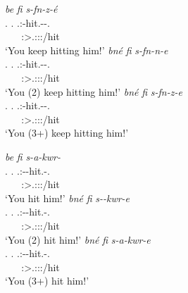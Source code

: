 \begin{exe}
\ex
\label{ex140}
\begin{xlist}
	\ex %
	\glll \emph{be} \emph{fi} \emph{s-fn-z-é}\\
	 \Ssg{}.\Erg{} \Third{}.\Abs{} \Tsg{}.\Masc{}:\Bet{}-hit.\Ext{}-\Ndu{}-\Ssg{}.\Imp{}\\
	 ~ ~ {\Ssg:\Sbj>\Tsg.\Masc:\Obj:\Imp:\Ipfv/hit}\\
	\trans `You keep hitting him!'
	\label{ex141}
	\ex %
	\glll \emph{bné} \emph{fi} \emph{s-fn-n-e}\\
	 \Snsg{}.\Erg{} \Third{}.\Abs{} \Tsg{}.\Masc{}:\Bet{}-hit.\Ext{}-\Du{}-\Snsg{}.\Imp{}\\
	  ~ ~ {\Sdu:\Sbj>\Tsg.\Masc:\Obj:\Imp:\Ipfv/hit}\\
	\trans `You (2) keep hitting him!'
	\label{ex142}
	\ex %
	\glll \emph{bné} \emph{fi} \emph{s-fn-z-e}\\
	 \Snsg{}.\Erg{} \Third{}.\Abs{} \Tsg{}.\Masc{}:\Bet{}-hit.\Ext{}-\Ndu{}-\Snsg{}.\Imp{}\\
	  ~ ~ {\Spl:\Sbj>\Tsg.\Masc:\Obj:\Imp:\Ipfv/hit}\\
	\trans `You (3+) keep hitting him!'
	\label{ex143}
\end{xlist}
\end{exe}%
\begin{exe}
\ex
\label{ex144}
\begin{xlist}
	\ex %
	\glll \emph{be} \emph{fi} \emph{s-a-kwr-\Zero{}}\\
	\Ssg{}.\Erg{} \Third{}.\Abs{} \Tsg{}.\Masc{}:\Bet{}-\Ndu{}-hit.\Rs{}-\Ssg{}.\Imp{}\\
	~ ~ {\Ssg:\Sbj>\Tsg.\Masc:\Obj:\Imp:\Pfv/hit}\\
	\trans `You hit him!'
	\label{ex145}
	\ex %
	\glll \emph{bné} \emph{fi} \emph{s-\Zero{}-kwr-e}\\
	\Snsg{}.\Erg{} \Third{}.\Abs{} \Tsg{}.\Masc{}:\Bet{}-\Du{}-hit.\Rs{}-\Snsg{}.\Imp{}\\
	~ ~ {\Sdu:\Sbj>\Tsg.\Masc:\Obj:\Imp:\Pfv/hit}\\
	\trans `You (2) hit him!'
	\label{ex146}
	\ex %
	\glll \emph{bné} \emph{fi} \emph{s-a-kwr-e}\\
	\Snsg{}.\Erg{} \Third{}.\Abs{} \Tsg{}.\Masc{}:\Bet{}-\Ndu{}-hit.\Rs{}-\Snsg{}.\Imp{}\\
	~ ~ {\Spl:\Sbj>\Tsg.\Masc:\Obj:\Imp:\Pfv/hit}\\
	\trans `You (3+) hit him!'
	\label{ex147}
\end{xlist}
\end{exe}%

